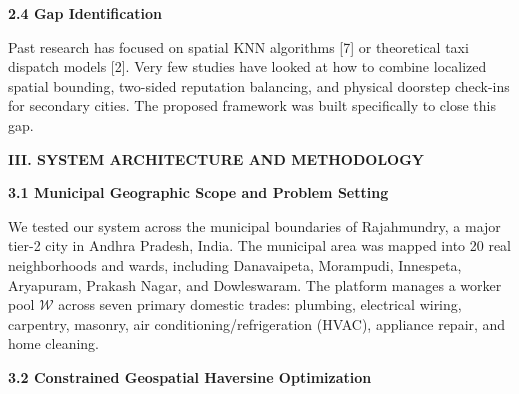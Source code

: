 \documentclass[10pt,twocolumn,a4paper]{article}
\begin{document}
\vspace{0.8em}
\noindent
\textbf{2.4 Gap Identification}

Past research has focused on spatial KNN algorithms [7] or theoretical taxi dispatch models [2]. Very few studies have looked at how to combine localized spatial bounding, two-sided reputation balancing, and physical doorstep check-ins for secondary cities. The proposed framework was built specifically to close this gap.

\vspace{1.2em}
\noindent
\textbf{\large III. SYSTEM ARCHITECTURE AND METHODOLOGY}

\vspace{0.5em}
\noindent
\textbf{3.1 Municipal Geographic Scope and Problem Setting}

We tested our system across the municipal boundaries of Rajahmundry, a major tier-2 city in Andhra Pradesh, India. The municipal area was mapped into 20 real neighborhoods and wards, including Danavaipeta, Morampudi, Innespeta, Aryapuram, Prakash Nagar, and Dowleswaram. The platform manages a worker pool $\mathcal{W}$ across seven primary domestic trades: plumbing, electrical wiring, carpentry, masonry, air conditioning/refrigeration (HVAC), appliance repair, and home cleaning.

\vspace{0.8em}
\noindent
\textbf{3.2 Constrained Geospatial Haversine Optimization}
\end{document}
